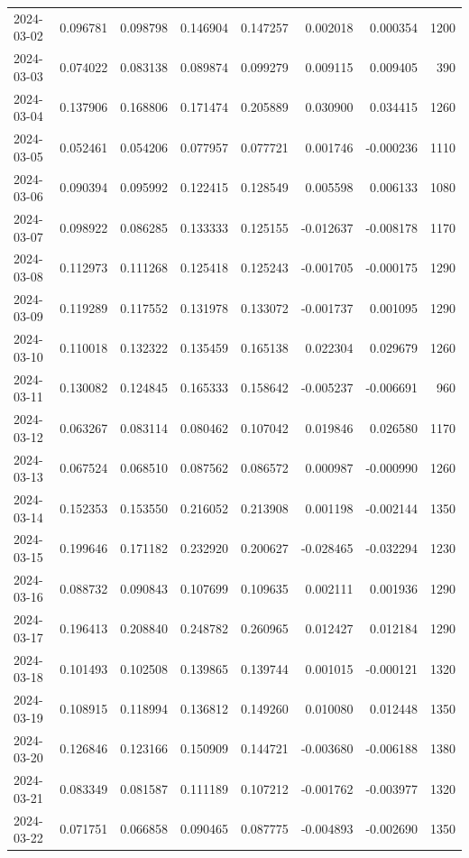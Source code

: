 \begin{tabular}{lrrrrrrr}
2024-03-02 & 0.096781 & 0.098798 & 0.146904 & 0.147257 & 0.002018 & 0.000354 & 1200 \\
2024-03-03 & 0.074022 & 0.083138 & 0.089874 & 0.099279 & 0.009115 & 0.009405 & 390 \\
2024-03-04 & 0.137906 & 0.168806 & 0.171474 & 0.205889 & 0.030900 & 0.034415 & 1260 \\
2024-03-05 & 0.052461 & 0.054206 & 0.077957 & 0.077721 & 0.001746 & -0.000236 & 1110 \\
2024-03-06 & 0.090394 & 0.095992 & 0.122415 & 0.128549 & 0.005598 & 0.006133 & 1080 \\
2024-03-07 & 0.098922 & 0.086285 & 0.133333 & 0.125155 & -0.012637 & -0.008178 & 1170 \\
2024-03-08 & 0.112973 & 0.111268 & 0.125418 & 0.125243 & -0.001705 & -0.000175 & 1290 \\
2024-03-09 & 0.119289 & 0.117552 & 0.131978 & 0.133072 & -0.001737 & 0.001095 & 1290 \\
2024-03-10 & 0.110018 & 0.132322 & 0.135459 & 0.165138 & 0.022304 & 0.029679 & 1260 \\
2024-03-11 & 0.130082 & 0.124845 & 0.165333 & 0.158642 & -0.005237 & -0.006691 & 960 \\
2024-03-12 & 0.063267 & 0.083114 & 0.080462 & 0.107042 & 0.019846 & 0.026580 & 1170 \\
2024-03-13 & 0.067524 & 0.068510 & 0.087562 & 0.086572 & 0.000987 & -0.000990 & 1260 \\
2024-03-14 & 0.152353 & 0.153550 & 0.216052 & 0.213908 & 0.001198 & -0.002144 & 1350 \\
2024-03-15 & 0.199646 & 0.171182 & 0.232920 & 0.200627 & -0.028465 & -0.032294 & 1230 \\
2024-03-16 & 0.088732 & 0.090843 & 0.107699 & 0.109635 & 0.002111 & 0.001936 & 1290 \\
2024-03-17 & 0.196413 & 0.208840 & 0.248782 & 0.260965 & 0.012427 & 0.012184 & 1290 \\
2024-03-18 & 0.101493 & 0.102508 & 0.139865 & 0.139744 & 0.001015 & -0.000121 & 1320 \\
2024-03-19 & 0.108915 & 0.118994 & 0.136812 & 0.149260 & 0.010080 & 0.012448 & 1350 \\
2024-03-20 & 0.126846 & 0.123166 & 0.150909 & 0.144721 & -0.003680 & -0.006188 & 1380 \\
2024-03-21 & 0.083349 & 0.081587 & 0.111189 & 0.107212 & -0.001762 & -0.003977 & 1320 \\
2024-03-22 & 0.071751 & 0.066858 & 0.090465 & 0.087775 & -0.004893 & -0.002690 & 1350 \\

\end{tabular}
